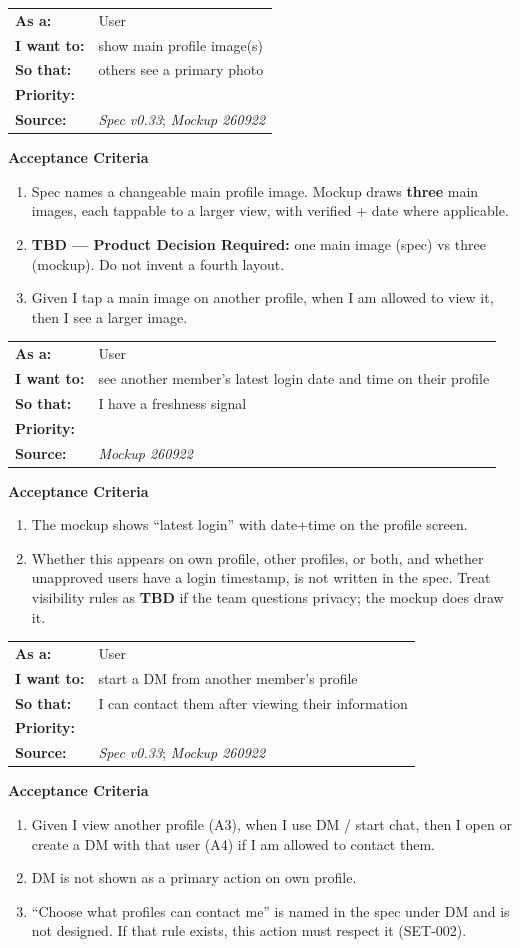 \documentclass[11pt,a4paper]{article}
\makeatletter
\newcommand{\priPzero}{\colorbox{p0}{\makebox[4.6em]{\textcolor{white}{\scriptsize\bfseries P0 V1}}}}
\newcommand{\priPone}{\colorbox{p1}{\makebox[4.6em]{\textcolor{white}{\scriptsize\bfseries P1}}}}
\newcommand{\srcSpec}{\textit{Spec v0.33}}
\newcommand{\srcMock}{\textit{Mockup 260922}}
\newenvironment{story}[1]{%
  \Needspace{10\baselineskip}%
  \vspace{0.7em}%
  \noindent
  \colorbox{navy}{\makebox[\dimexpr\textwidth-2\fboxsep\relax][l]{\textcolor{white}{\bfseries\ #1}}}%
  \par\vspace{0.35em}%
}{\par\vspace{0.55em}}
\newcommand{\storymeta}[5]{%
  \noindent
  \begin{tabularx}{\textwidth}{@{}>{\bfseries}l X@{}}
    As a: & #1 \\
    I want to: & #2 \\
    So that: & #3 \\
    Priority: & #4 \\
    Source: & #5 \\
  \end{tabularx}
  \par\vspace{0.3em}
}
\newcommand{\achead}{\noindent\textbf{Acceptance Criteria}\par}
\makeatother
\begin{document}
\begin{story}{PROF-008 --- Main profile image(s)}
\storymeta{User}{show main profile image(s)}{others see a primary photo}{\priPzero}{\srcSpec; \srcMock}
\achead
\begin{enumerate}
  \item Spec names a changeable main profile image. Mockup draws \textbf{three} main images, each tappable to a larger view, with verified + date where applicable.
  \item \textbf{TBD --- Product Decision Required:} one main image (spec) vs three (mockup). Do not invent a fourth layout.
  \item Given I tap a main image on another profile, when I am allowed to view it, then I see a larger image.
\end{enumerate}
\end{story}

\begin{story}{PROF-009 --- Latest login shown on profile}
\storymeta{User}{see another member's latest login date and time on their profile}{I have a freshness signal}{\priPone}{\srcMock}
\achead
\begin{enumerate}
  \item The mockup shows ``latest login'' with date+time on the profile screen.
  \item Whether this appears on own profile, other profiles, or both, and whether unapproved users have a login timestamp, is not written in the spec. Treat visibility rules as \textbf{TBD} if the team questions privacy; the mockup does draw it.
\end{enumerate}
\end{story}

\begin{story}{PROF-010 --- Start a DM from another profile}
\storymeta{User}{start a DM from another member's profile}{I can contact them after viewing their information}{\priPzero}{\srcSpec; \srcMock}
\achead
\begin{enumerate}
  \item Given I view another profile (A3), when I use DM / start chat, then I open or create a DM with that user (A4) if I am allowed to contact them.
  \item DM is not shown as a primary action on own profile.
  \item ``Choose what profiles can contact me'' is named in the spec under DM and is not designed. If that rule exists, this action must respect it (SET-002).
\end{enumerate}
\end{story}
\end{document}

